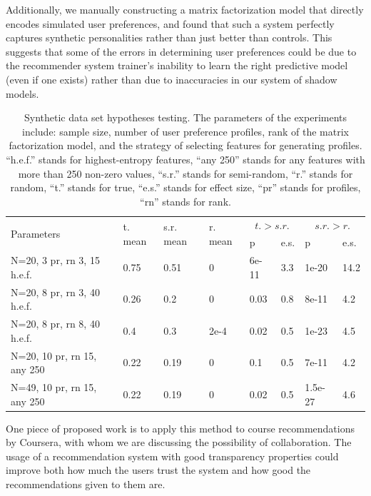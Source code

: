 Additionally, we manually constructing a matrix factorization model
that directly encodes simulated user preferences, and found that such
a system perfectly captures synthetic personalities rather than just
better than controls.
This suggests that some of the errors in determining user preferences
could be due to the recommender system trainer's inability to learn
the right predictive model (even if one exists) rather than due to
inaccuracies in our system of shadow models.
\begin{table}
  \small
  \begin{tabular}{|p{2cm}|p{1cm}|p{1cm}|p{1cm}|p{1cm}|p{1cm}|p{1cm}|p{1cm}|} \hline
    \multirow{2}{*}{Parameters} & \multirow{2}{0.55cm}{t. mean} & \multirow{2}{0.55cm}{s.r. mean} & \multirow{2}{0.55cm}{r. mean} & \multicolumn{2}{|c|}{\mbox{$t. > s.r.$}} & \multicolumn{2}{|c|}{$s.r. > r.$} \\
    \cline{5-8}                 &      &      &      & p     & e.s. & p       & e.s. \\ \hline
    {\scriptsize N=20, 3 pr, rn 3, 15 h.e.f.} & 0.75 & 0.51 & 0    & {\scriptsize 6e-11} & 3.3  & 1e-20   & 14.2 \\ \hline
    {\scriptsize N=20, 8 pr, rn 3, 40 h.e.f.} & 0.26 & 0.2  & 0    & 0.03  & 0.8  & 8e-11   & 4.2 \\ \hline
    {\scriptsize N=20, 8 pr, rn 8, 40 h.e.f.} & 0.4  & 0.3  & {\scriptsize 2e-4} & 0.02  & 0.5  & 1e-23   & 4.5 \\ \hline
    {\scriptsize N=20, 10 pr, rn 15, any 250} & 0.22 & 0.19 & 0    & 0.1   & 0.5  & 7e-11   & 4.2 \\ \hline
    {\scriptsize N=49, 10 pr, rn 15, any 250} & 0.22 & 0.19 & 0    & 0.02  & 0.5  & {\scriptsize 1.5e-27} & 4.6 \\ \hline
  \end{tabular}%
  \caption{\label{table:ttest} Synthetic data set hypotheses testing.
    The parameters of the experiments include: sample size, number of user preference profiles, rank of the matrix factorization model, and the strategy of selecting features for generating profiles.
    ``h.e.f.''
    stands for highest-entropy features, ``any 250'' stands for any features with more than 250 non-zero values, ``s.r.''
    stands for semi-random, ``r.''
    stands for random, ``t.''
    stands for true, ``e.s.''
    stands for effect size, ``pr'' stands for profiles, ``rn'' stands for rank.}
\end{table}









One piece of proposed work is to apply this method to course recommendations by
Coursera, with whom we are discussing the possibility of collaboration. The
usage of a recommendation system with good transparency properties could improve
both how much the users trust the system and how good the recommendations
given to them are.
